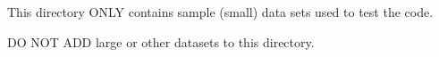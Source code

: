 This directory O\+N\+LY contains sample (small) data sets used to test the code.

DO N\+OT A\+DD large or other datasets to this directory. 